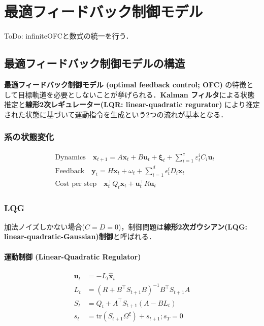 \section{最適フィードバック制御モデル}
ToDo: infiniteOFCと数式の統一を行う．

\subsection{最適フィードバック制御モデルの構造}
\textbf{最適フィードバック制御モデル (optimal feedback control; OFC)} の特徴として目標軌道を必要としないことが挙げられる．\textbf{Kalman フィルタ}による状態推定と\textbf{線形2次レギュレーター(LQR: linear-quadratic regurator)} により推定された状態に基づいて運動指令を生成という2つの流れが基本となる．
\subsubsection{系の状態変化}


\begin{align}
&\text {Dynamics} \quad \mathbf{x}_{t+1}=A \mathbf{x}_{t}+B \mathbf{u}_{t}+\boldsymbol{\xi}_{t}+\sum_{i=1}^{c} \varepsilon_{t}^{i} C_{i} \mathbf{u}_{t}\\
&\text {Feedback} \quad \mathbf{y}_{t}=H \mathbf{x}_{t}+\omega_{t}+\sum_{i=1}^{d} \epsilon_{t}^{i} D_{i} \mathbf{x}_{t}\\
&\text{Cost per step}\quad \mathbf{x}_{t}^\top Q_{t} \mathbf{x}_{t}+\mathbf{u}_{t}^\top R \mathbf{u}_{t}
\end{align}


\subsubsection{LQG}
加法ノイズしかない場合($C=D=0$)，制御問題は\textbf{線形2次ガウシアン(LQG: linear-quadratic-Gaussian)制御}と呼ばれる．


\paragraph{運動制御 (Linear-Quadratic Regulator)}


\begin{align}
\mathbf{u}_{t}&=-L_{t} \widehat{\mathbf{x}}_{t}\\
L_{t}&=\left(R+B^{\top} S_{t+1} B\right)^{-1} B^{\top} S_{t+1} A\\
S_{t}&=Q_{t}+A^{\top} S_{t+1}\left(A-B L_{t}\right)\\
s_t &= \mathrm{tr}(S_{t+1}\Omega^\xi) + s_{t+1}; s_T=0
\end{align}


